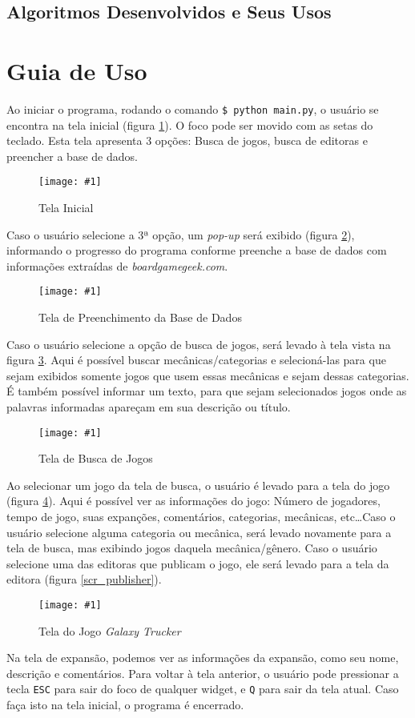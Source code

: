 \documentclass[hidelinks,12pt,article,twocolumn,brazil]{abntex2}
\newcommand{\imagem}[3]{\begin{figure}[htb]
    \begin{center}
        \texttt{[image: \#1]}\\
        \caption{#2}
        \label{#3}
    \end{center}
\end{figure}}
\def\bgg{\textit{boardgamegeek.com}}
\begin{document}
\subsection{Algoritmos Desenvolvidos e Seus Usos}

\section{Guia de Uso}

Ao iniciar o programa, rodando o comando \texttt{\$ python main.py}, o usuário se encontra na tela inicial (figura \ref{scr_init}). O foco pode ser movido com as setas do teclado. Esta tela apresenta 3 opções: Busca de jogos, busca de editoras e preencher a base de dados.

\imagem{img/scr_init.png}{Tela Inicial}{scr_init}

Caso o usuário selecione a 3ª opção, um \textit{pop-up} será exibido (figura \ref{scr_fill}), informando o progresso do programa conforme preenche a base de dados com informações extraídas de \bgg.

\imagem{img/scr_fill}{Tela de Preenchimento da Base de Dados}{scr_fill}

Caso o usuário selecione a opção de busca de jogos, será levado à tela vista na figura \ref{scr_search}. Aqui é possível buscar mecânicas/categorias e selecioná-las para que sejam exibidos somente jogos que usem essas mecânicas e sejam dessas categorias. É também possível informar um texto, para que sejam selecionados jogos onde as palavras informadas apareçam em sua descrição ou título.

\imagem{img/scr_search.png}{Tela de Busca de Jogos}{scr_search}

Ao selecionar um jogo da tela de busca, o usuário é levado para a tela do jogo (figura \ref{scr_game}). Aqui é possível ver as informações do jogo: Número de jogadores, tempo de jogo, suas expanções, comentários, categorias, mecânicas, etc\ldots Caso o usuário selecione alguma categoria ou mecânica, será levado novamente para a tela de busca, mas exibindo jogos daquela mecânica/gênero. Caso o usuário selecione uma das editoras que publicam o jogo, ele será levado para a tela da editora (figura \ref{scr_publisher}).

\imagem{img/scr_game.png}{Tela do Jogo \textit{Galaxy Trucker}}{scr_game}

Na tela de expansão, podemos ver as informações da expansão, como seu nome, descrição e comentários. Para voltar à tela anterior, o usuário pode pressionar a tecla \texttt{ESC} para sair do foco de qualquer widget, e \texttt{Q} para sair da tela atual. Caso faça isto na tela inicial, o programa é encerrado.
\end{document}
